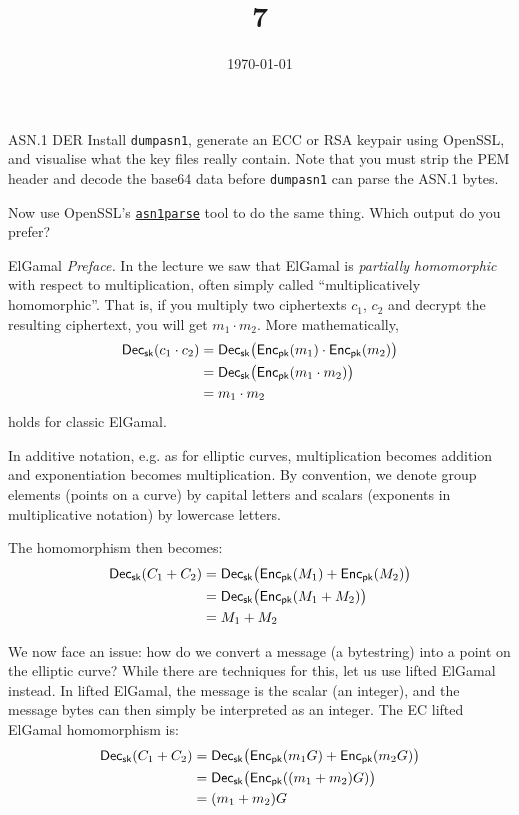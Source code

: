 \documentclass{practice}
\title{7}
\date{\today}
\begin{document}
\maketitle

\begin{task}{ASN.1 DER}
  Install \texttt{dumpasn1}, generate an ECC or RSA keypair using OpenSSL, and visualise what the key files really contain.
  Note that you must strip the PEM header and decode the base64 data before \texttt{dumpasn1} can parse the ASN.1 bytes.

  Now use OpenSSL's \href{https://docs.openssl.org/master/man1/openssl-asn1parse/}{\texttt{asn1parse}} tool to do the same thing.
  Which output do you prefer?
\end{task}

\begin{task}{ElGamal}
  \textit{Preface.}
  In the lecture we saw that ElGamal is \emph{partially homomorphic} with respect to multiplication, often simply called \enquote{multiplicatively homomorphic}.
  That is, if you multiply two ciphertexts $c_1$, $c_2$ and decrypt the resulting ciphertext, you will get $m_1 \cdot m_2$.
  More mathematically,
  \begin{align*}
    \mathsf{Dec}_{\mathsf{sk}}(c_1 \cdot c_2) &= 
    \mathsf{Dec}_{\mathsf{sk}}\bigl(\mathsf{Enc}_{\mathsf{pk}}(m_1) \cdot \mathsf{Enc}_{\mathsf{pk}}(m_2)\bigr)\\
    &= \mathsf{Dec}_{\mathsf{sk}}\bigl(\mathsf{Enc}_{\mathsf{pk}}(m_1\cdot m_2)\bigr)\\
    &= m_1 \cdot m_2
  \end{align*}
  holds for classic ElGamal.

  In additive notation, e.g. as for elliptic curves, multiplication becomes addition and exponentiation becomes multiplication.
  By convention, we denote group elements (points on a curve) by capital letters and scalars (exponents in multiplicative notation) by lowercase letters.

  The homomorphism then becomes:
  \begin{align*}
    \mathsf{Dec}_{\mathsf{sk}}(C_1 + C_2) &= 
    \mathsf{Dec}_{\mathsf{sk}}\bigl(\mathsf{Enc}_{\mathsf{pk}}(M_1) + \mathsf{Enc}_{\mathsf{pk}}(M_2)\bigr)\\
    &= \mathsf{Dec}_{\mathsf{sk}}\bigl(\mathsf{Enc}_{\mathsf{pk}}(M_1 + M_2)\bigr)\\
    &= M_1 + M_2
  \end{align*}

  We now face an issue: how do we convert a message (a bytestring) into a point on the elliptic curve?
  While there are techniques for this, let us use lifted ElGamal instead.
  In lifted ElGamal, the message is the scalar (an integer), and the message bytes can then simply be interpreted as an integer.
  The EC lifted ElGamal homomorphism is:
  \begin{align*}
    \mathsf{Dec}_{\mathsf{sk}}(C_1 + C_2) &= 
    \mathsf{Dec}_{\mathsf{sk}}\bigl(\mathsf{Enc}_{\mathsf{pk}}(m_1G) + \mathsf{Enc}_{\mathsf{pk}}(m_2G)\bigr)\\
    &= \mathsf{Dec}_{\mathsf{sk}}\bigl(\mathsf{Enc}_{\mathsf{pk}}((m_1 + m_2)G)\bigr)\\
    &= (m_1 + m_2)G
  \end{align*}


\end{task}
\end{document}
